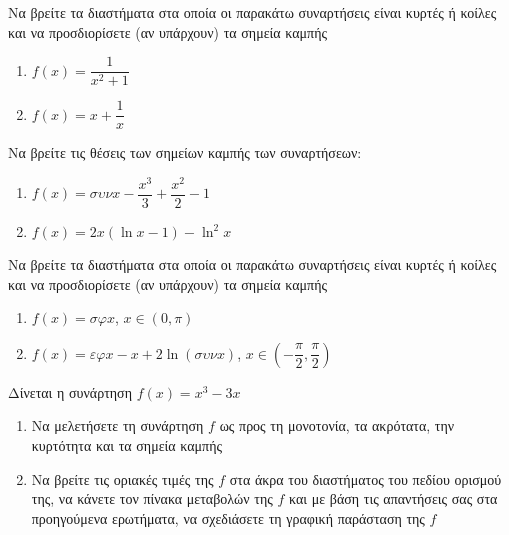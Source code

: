 \documentclass{../presentation}
\begin{document}
\begin{askisi}
  Να βρείτε τα διαστήματα στα οποία οι παρακάτω συναρτήσεις είναι κυρτές ή κοίλες και να προσδιορίσετε (αν υπάρχουν) τα σημεία καμπής
  \begin{enumerate}
    \item<1-> $f(x)=\dfrac{1}{x^2+1}$
    \item<2-> $f(x)=x+\dfrac{1}{x}$
  \end{enumerate}

\end{askisi}

\begin{askisi}
  Να βρείτε τις θέσεις των σημείων καμπής των συναρτήσεων:
  \begin{enumerate}
    \item<1-> $f(x)=συνx-\dfrac{x^3}{3}+\dfrac{x^2}{2}-1$
    \item<2-> $f(x)=2x(\ln x-1)-\ln^2x$
  \end{enumerate}

\end{askisi}

\begin{askisi}
  Να βρείτε τα διαστήματα στα οποία οι παρακάτω συναρτήσεις είναι κυρτές ή κοίλες και να προσδιορίσετε (αν υπάρχουν) τα σημεία καμπής
  \begin{enumerate}
    \item<1-> $f(x)=σφx$, $x\in (0,\pi)$
    \item<2-> $f(x)=εφx-x+2\ln (συνx)$, $x\in (-\dfrac{\pi}{2},\dfrac{\pi}{2})$
  \end{enumerate}

\end{askisi}

\begin{askisi}
  Δίνεται η συνάρτηση $f(x)=x^3-3x$
  \begin{enumerate}
    \item<1-> Να μελετήσετε τη συνάρτηση $f$ ως προς τη μονοτονία, τα ακρότατα, την κυρτότητα και τα σημεία καμπής
    \item<2-> Να βρείτε τις οριακές τιμές της $f$ στα άκρα του διαστήματος του πεδίου ορισμού της, να κάνετε τον πίνακα μεταβολών της $f$ και με βάση τις απαντήσεις σας στα προηγούμενα ερωτήματα, να σχεδιάσετε τη γραφική παράσταση της $f$
  \end{enumerate}

\end{askisi}
\end{document}
